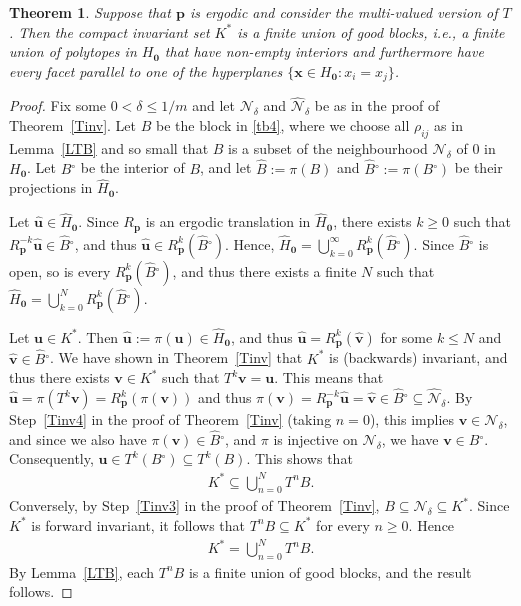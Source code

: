 \documentclass[11pt,reqno,tbtags,a4paper]{amsart}
\numberwithin{equation}{section}
\renewcommand\le{\leq}
\renewcommand\ge{\geq}
\renewcommand\leq{\leqslant}
\renewcommand\geq{\geqslant}
\theoremstyle{plain}%
\newtheorem{theorem}{Theorem}[section]
\theoremstyle{definition}
\theoremstyle{remark}
\newcommand{\refT}[1]{Theorem~\ref{#1}}
\newcommand{\refL}[1]{Lemma~\ref{#1}}
\newcommand{\refStep}[1]{Step~\ref{#1}}
\newcommand\set[1]{\ensuremath{\{#1\}}}
\newcommand\inter{\ensuremath{^\circ}}
\newcommand\gd{\delta}
\newcommand\cN{\mathcal N}
\newcommand\Ho{H_{\0}}
\newcommand\hHo{\hH_{\0}}
\newcommand\vp{\mathbf{p}}
\newcommand\vu{\mathbf{u}}
\newcommand\hvu{{\hat{\mathbf{u}}}}
\newcommand\vv{\mathbf{v}}
\newcommand\hvv{{\hat{\mathbf{v}}}}
\newcommand\vx{\mathbf{x}}
\newcommand\hH{\widehat{H}}
\newcommand\hcN{\widehat{\cN}}
\newcommand\Kx{K^*}
\newcommand\hB{\widehat B}
\newcommand\hBo{\hB\inter}
\newcommand\Bo{B\inter}
\newcommand\0{{\boldsymbol 0}}
\newcommand\1{{\boldsymbol 1}}
\begin{document}
\begin{theorem}\label{TB}
Suppose that $\vp$ is ergodic and consider the multi-valued version of $T$.
Then the compact invariant set $\Kx$
is a finite union of good blocks,
i.e., a finite union of polytopes in $\Ho$
that have non-empty interiors and furthermore have every facet parallel to
one of the hyperplanes  $\set{\vx\in\Ho:x_i=x_j}$. 
\end{theorem}
\begin{proof}

Fix some $0<\gd\le 1/m$ and let 
 $\cN_\gd$ and $\hcN_\gd$ be as in the proof of \refT{Tinv}.
Let
$B$ be the block in \eqref{tb4}, 
where we choose all $\rho_{ij}$ as in \refL{LTB} and so
small that $B$ is a subset of the neighbourhood
$\cN_\gd$  of $0$ in $\Ho$. 
Let $\Bo$ be the interior of $B$, and let
$\hB:=\pi(B)$ and 
$\hBo:=\pi(\Bo)$ be their projections in $\hHo$. 

Let $\hvu\in \hHo$.
Since $R_\vp$ is an ergodic
translation in $\hHo$, there exists $k\ge0$ such
that $R_\vp^{-k}\hvu\in \hBo$, and thus
$\hvu\in R_\vp^{k}(\hBo)$.
Hence, $\hHo=\bigcup_{k=0}^\infty R_\vp^k(\hBo)$.
Since $\hBo$ is open, so is every $R_\vp^k(\hBo)$,
and thus there exists a finite $N$ such that
$\hHo=\bigcup_{k=0}^N R_\vp^k(\hBo)$.

Let $\vu\in \Kx$. Then $\hvu:=\pi(\vu)\in\hHo$, 
and thus $\hvu=R_\vp^k(\hvv)$ for some $k\le N$ and $\hvv\in\hBo$.
%
We have shown in \refT{Tinv} that $\Kx$ is (backwards) invariant, and thus
there exists 
$\vv\in\Kx$ such that $T^k\vv=\vu$.
This means that $\hvu=\pi(T^k\vv)=R_\vp^k(\pi(\vv))$ and thus
$\pi(\vv)=R_\vp^{-k}\hvu=\hvv\in \hBo \subseteq\hcN_\gd$.
By \refStep{Tinv4} in the proof of \refT{Tinv}
(taking $n=0$), this implies $\vv\in\cN_\gd$, and since we
also have $\pi(\vv)\in\hBo$, and $\pi$ is injective on $\cN_\gd$, we have
$\vv\in\Bo$. Consequently, $\vu\in T^k(\Bo)\subseteq T^k(B)$.
This shows that
\begin{align}
  \Kx\subseteq\bigcup_{n=0}^N T^n B.
\end{align}
Conversely, by \refStep{Tinv3} in the proof of \refT{Tinv},
$B\subseteq\cN_\gd\subseteq\Kx$.  Since $\Kx$ is forward invariant, it follows
that $T^nB\subseteq\Kx$ for every $n\ge0$.  Hence
\begin{align}
  \Kx=\bigcup_{n=0}^N T^n B.
\end{align}
By \refL{LTB}, each $T^nB$ is a finite union of good blocks, and the result
follows.  
\end{proof}
\end{document}
